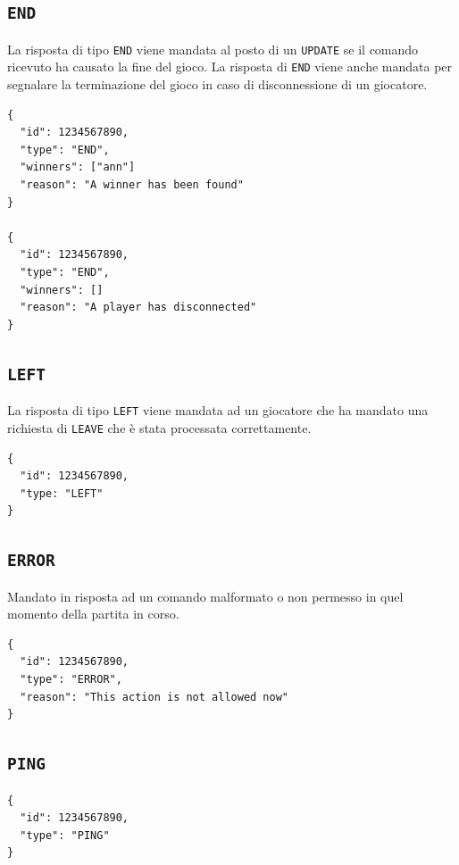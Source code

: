 \documentclass[a4paper,12pt]{article}
\begin{document}
\subsection{\texttt{END}}

La risposta di tipo \texttt{END} viene mandata al posto di un
\texttt{UPDATE} se il comando ricevuto ha causato la fine del gioco. La
risposta di \texttt{END} viene anche mandata per segnalare la terminazione
del gioco in caso di disconnessione di un giocatore.

\begin{verbatim}
{
  "id": 1234567890,
  "type": "END",
  "winners": ["ann"]
  "reason": "A winner has been found"
}

{
  "id": 1234567890,
  "type": "END",
  "winners": []
  "reason": "A player has disconnected"
}
\end{verbatim}

\subsection{\texttt{LEFT}}

La risposta di tipo \texttt{LEFT} viene mandata ad un giocatore che ha mandato
una richiesta di \texttt{LEAVE} che è stata processata correttamente.

\begin{verbatim}
{
  "id": 1234567890,
  "type: "LEFT"
}
\end{verbatim}

\subsection{\texttt{ERROR}}

Mandato in risposta ad un comando malformato o non permesso in quel momento
della partita in corso.

\begin{verbatim}
{
  "id": 1234567890,
  "type": "ERROR",
  "reason": "This action is not allowed now"
}
\end{verbatim}

\subsection{\texttt{PING}}

\begin{verbatim}
{
  "id": 1234567890,
  "type": "PING"
}
\end{verbatim}
\end{document}
